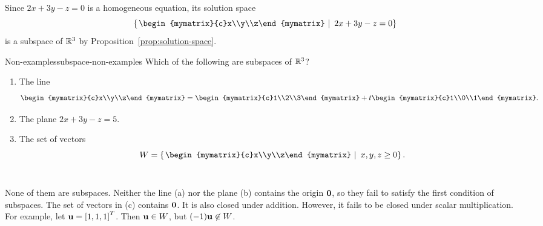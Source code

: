 \begin{solution}
  Since $2x+3y-z=0$ is a homogeneous equation, its solution space
  \begin{equation*}
    \set{\left.\begin{mymatrix}{c}x\\y\\z\end{mymatrix}~\right\vert~ 2x+3y-z=0}
  \end{equation*}
  is a subspace of $\mathbb{R}^3$ by Proposition~\ref{prop:solution-space}.
\end{solution}

\begin{example}{Non-examples}{subspace-non-examples}
  Which of the following are subspaces of $\mathbb{R}^3$?
  \begin{enumialphparenastyle}
    \begin{enumerate}
    \item The line
      \begin{equation*}
        \begin{mymatrix}{c}x\\y\\z\end{mymatrix}
        = \begin{mymatrix}{c}1\\2\\3\end{mymatrix}
        + t\begin{mymatrix}{c}1\\0\\1\end{mymatrix}.
      \end{equation*}
    \item The plane $2x+3y-z=5$.
    \item The set of vectors
      \begin{equation*}
        W=\set{\left.\begin{mymatrix}{c}x\\y\\z\end{mymatrix}
            ~\right\vert~ x,y,z\geq 0}.
      \end{equation*}
      ~
    \end{enumerate}
  \end{enumialphparenastyle}
\end{example}

\begin{solution}
  None of them are subspaces. Neither the line (a) nor the plane (b)
  contains the origin $\mbox{\bf 0}$, so they fail to satisfy the first
  condition of subspaces. The set of vectors in (c) contains
  $\mbox{\bf 0}$. It is also closed under addition. However, it fails to
  be closed under scalar multiplication. For example, let
  $\mbox{\bf u}=\left[1,1,1\right]^T$. Then $\mbox{\bf u}\in W$, but
  $(-1)\mbox{\bf u}\not\in W$.
\end{solution}

